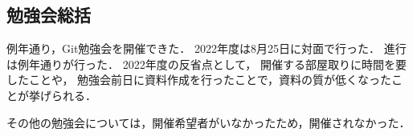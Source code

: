 \subsection*{勉強会総括}

例年通り，Git勉強会を開催できた．
2022年度は8月25日に対面で行った．
進行は例年通り\secondGrade{}が行った．
2022年度の反省点として，
開催する部屋取りに時間を要したことや，
勉強会前日に資料作成を行ったことで，資料の質が低くなったことが挙げられる．

その他の勉強会については，開催希望者がいなかったため，開催されなかった．

